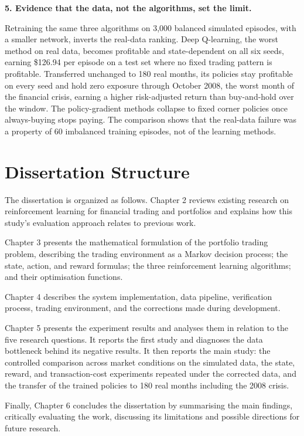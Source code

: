 \textbf{5. Evidence that the data, not the algorithms, set the limit.}

Retraining the same three algorithms on 3,000 balanced simulated
episodes, with a smaller network, inverts the real-data ranking. Deep
Q-learning, the worst method on real data, becomes profitable and
state-dependent on all six seeds, earning \$126.94 per episode on a
test set where no fixed trading pattern is profitable. Transferred
unchanged to 180 real months, its policies stay profitable on every
seed and hold zero exposure through October 2008, the worst month of
the financial crisis, earning a higher risk-adjusted return than
buy-and-hold over the window. The policy-gradient methods collapse to
fixed corner policies once always-buying stops paying. The comparison
shows that the real-data failure was a property of 60 imbalanced
training episodes, not of the learning methods.

\section{Dissertation Structure}

The dissertation is organized as follows. Chapter 2 reviews existing
research on reinforcement learning for financial trading and portfolios
and explains how this study's evaluation approach relates to previous
work.

Chapter 3 presents the mathematical formulation of the portfolio trading
problem, describing the trading environment as a Markov decision
process; the state, action, and reward formulas; the three reinforcement
learning algorithms; and their optimisation functions.

Chapter 4 describes the system implementation, data pipeline,
verification process, trading environment, and the corrections made
during development.

Chapter 5 presents the experiment results and analyses them in relation
to the five research questions. It reports the first study and diagnoses
the data bottleneck behind its negative results. It then reports the
main study: the controlled comparison across market conditions on the simulated data,
the state, reward, and transaction-cost experiments repeated under the
corrected data, and the transfer of the trained policies to 180 real
months including the 2008 crisis.

Finally, Chapter 6 concludes the dissertation by summarising the main
findings, critically evaluating the work, discussing its limitations and
possible directions for future research.
